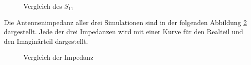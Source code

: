 \begin{figure}[!ht]
	\centering
	\begingroup
	
	\endgroup
	\caption{Vergleich des $S_{11}$}
	\label{S11_Vergleich_Simulation}
\end{figure}
\newpage
Die Antennenimpedanz aller drei Simulationen sind in der folgenden Abbildung \ref{Impedanz_Vergleich_Simulation} dargestellt. Jede der drei Impedanzen wird mit einer Kurve für den Realteil und den Imaginärteil dargestellt. 
\begin{figure}[!ht]
	\centering
	\begingroup
	
	\endgroup
	\caption{Vergleich der Impedanz}
	\label{Impedanz_Vergleich_Simulation}
\end{figure}
\clearpage
\newpage

